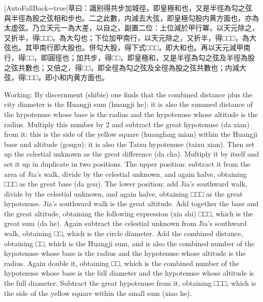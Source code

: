 \documentclass[11pt]{article}
\newcommand{\unitlabel}[1]{\marginpar{\raggedleft\tiny\color{gray}#1}}
\newenvironment{unitzh}{\par\CJKfontspec{Noto Serif CJK SC}[AutoFallBack=true]\large\linespread{1.25}\selectfont}{\par}
\newenvironment{uniten}{\par\small\color{black!85}}{\par\medskip}
\begin{document}
\begin{unitzh}\unitlabel{ceyuan-016.4}草曰：識别得共步加城徑，即皇極和也，又是半徑為勾之弦與半徑為股之弦相和步也。二之此數，内減去大弦，即皇極勾股内黄方面也，亦為太虚弦。乃立天元一為大差，以自之，副置二位：上位減於甲行冪，以天元除之，又折半，得□□□，為大勾也；下位加甲南行，以天元除之，又折半，得□□□，為大弦也。其甲南行即大股也。併勾大股，得下式□□□，即大和也。再以天元減甲南行，得□□，即圓徑也；加共步，得□□，即皇極和，又是半徑為勾之弦及半徑為股之弦共數也；又倍之，得□□，即全徑為勾之弦及全徑為股之弦共數也；内減大弦，得□□□，即小和内黄方面也。\end{unitzh}
\begin{uniten}Working: By discernment (shibie) one finds that the combined distance plus the city diameter is the Huangji sum (huangji he); it is also the summed distance of the hypotenuse whose base is the radius and the hypotenuse whose altitude is the radius. Multiply this number by 2 and subtract the great hypotenuse (da xian) from it: this is the side of the yellow square (huangfang mian) within the Huangji base and altitude (gougu); it is also the Taixu hypotenuse (taixu xian). Then set up the celestial unknown as the great difference (da cha). Multiply it by itself and set it up in duplicate in two positions. The upper position: subtract it from the area of Jia's walk, divide by the celestial unknown, and again halve, obtaining □□□ as the great base (da gou). The lower position: add Jia's southward walk, divide by the celestial unknown, and again halve, obtaining □□□ as the great hypotenuse. Jia's southward walk is the great altitude. Add together the base and the great altitude, obtaining the following expression (xia shi) □□□, which is the great sum (da he). Again subtract the celestial unknown from Jia's southward walk, obtaining □□, which is the circle diameter. Add the combined distance, obtaining □□, which is the Huangji sum, and is also the combined number of the hypotenuse whose base is the radius and the hypotenuse whose altitude is the radius. Again double it, obtaining □□, which is the combined number of the hypotenuse whose base is the full diameter and the hypotenuse whose altitude is the full diameter. Subtract the great hypotenuse from it, obtaining □□□, which is the side of the yellow square within the small sum (xiao he).\end{uniten}
\end{document}
